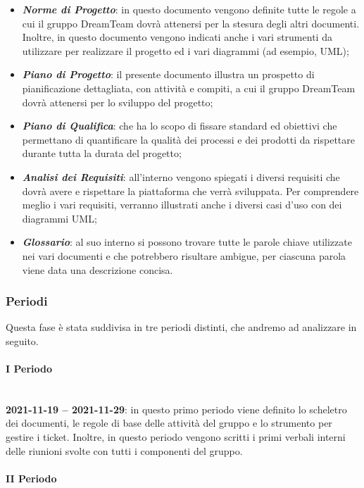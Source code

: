 \begin{itemize}
\item \textbf{\textit{Norme di Progetto}}: in questo documento vengono definite tutte le regole a cui il gruppo DreamTeam dovrà attenersi per la stesura degli altri documenti. Inoltre, in questo documento vengono indicati anche i vari strumenti da utilizzare per realizzare il progetto ed i vari diagrammi (ad esempio, UML);  
\item \textbf{\textit{Piano di Progetto}}: il presente documento illustra un prospetto di pianificazione dettagliata, con attività e compiti, a cui il gruppo DreamTeam dovrà attenersi per lo sviluppo del progetto;
\item \textbf{\textit{Piano di Qualifica}}: che ha lo scopo di fissare standard ed obiettivi che permettano di quantificare la qualità dei processi e dei prodotti da rispettare durante tutta la durata del progetto;
\item \textbf{\textit{Analisi dei Requisiti}}: all’interno vengono spiegati i diversi requisiti che dovrà avere e rispettare la piattaforma che verrà sviluppata. Per comprendere meglio i vari requisiti, verranno illustrati anche i diversi casi d’uso con dei diagrammi UML;
\item \textbf{\textit{Glossario}}: al suo interno si possono trovare tutte le parole chiave utilizzate nei vari documenti e che potrebbero risultare ambigue, per ciascuna parola viene data una descrizione concisa.
\end{itemize}

\subsubsection{Periodi}

Questa fase è stata suddivisa in tre periodi distinti, che andremo ad analizzare in seguito.

\paragraph{I Periodo} \mbox{} \\

\textbf{2021-11-19 – 2021-11-29}: in questo primo periodo viene definito lo scheletro dei documenti, le regole di base delle attività del gruppo e lo strumento per gestire i ticket. Inoltre, in questo periodo vengono scritti i primi verbali interni delle riunioni svolte con tutti i componenti del gruppo.

\paragraph{II Periodo} \mbox{} \\

